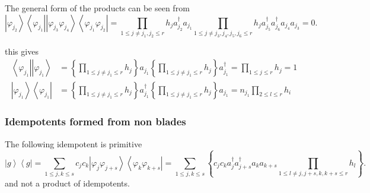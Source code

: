 \documentclass[aps,preprint]{revtex4}%
\begin{document}
The general form of the products can be seen from
\begin{equation}
\left\vert \varphi_{j_{2}}\right\rangle \left\langle \varphi_{j_{1}%
}\right\vert \left\vert \varphi_{j_{3}}\varphi_{j_{4}}\right\rangle
\left\langle \varphi_{j_{1}}\varphi_{j_{2}}\right\vert =%
{\displaystyle\prod\limits_{1\leq j\neq j_{1},j_{2}\leq r}}
h_{j}a_{j_{2}}^{\dagger}a_{j_{1}}%
{\displaystyle\prod\limits_{1\leq j\neq j_{3},j_{4},j_{5},j_{6}\leq r}}
h_{j}a_{j_{5}}^{\dagger}a_{j_{6}}^{\dagger}a_{j_{4}}a_{j_{3}}=0.
\end{equation}


this gives%
\begin{align}
\left\langle \varphi_{j_{1}}\right\vert \left\vert \varphi_{j_{1}%
}\right\rangle  &  =\left\{
{\displaystyle\prod\limits_{1\leq j\neq j_{1}\leq r}}
h_{j}\right\}  a_{j_{1}}\left\{
{\displaystyle\prod\limits_{1\leq j\neq j_{1}\leq r}}
h_{j}\right\}  a_{j_{1}}^{\dagger}=%
{\displaystyle\prod\limits_{1\leq j\leq r}}
h_{j}=1\\
\left\vert \varphi_{j_{1}}\right\rangle \left\langle \varphi_{j_{1}%
}\right\vert  &  =\left\{
{\displaystyle\prod\limits_{1\leq j\neq j_{1}\leq r}}
h_{j}\right\}  a_{j_{1}}^{\dagger}\left\{
{\displaystyle\prod\limits_{1\leq j\neq j_{1}\leq r}}
h_{j}\right\}  a_{j_{1}}=n_{j_{1}}%
{\displaystyle\prod\limits_{2\leq l\leq r}}
h_{i}%
\end{align}


\subsubsection{Idempotents formed from non blades}

The following idempotent is primitive
\begin{equation}
\left\vert g\right\rangle \left\langle g\right\vert =\sum_{1\leq j,k\leq
s}c_{j}c_{k}\left\vert \varphi_{j}\varphi_{j+s}\right\rangle \left\langle
\varphi_{k}\varphi_{k+s}\right\vert =\sum_{1\leq j,k\leq s}\left\{  c_{j}%
c_{k}a_{j}^{\dagger}a_{j+s}^{\dagger}a_{k}a_{k+s}%
{\displaystyle\prod\limits_{1\leq l\neq j,j+s,k,k+s\leq r}}
h_{l}\right\}  .
\end{equation}
and not a product of idempotents.
\end{document}

